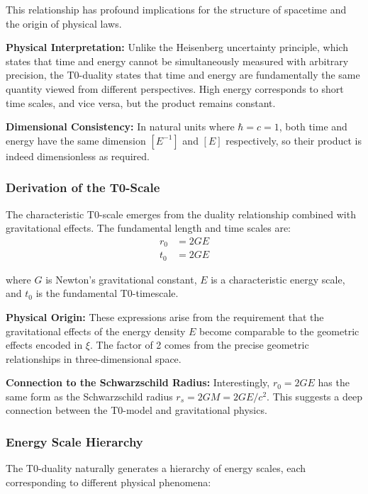 \documentclass[12pt,a4paper]{article}
\newcommand{\Tzero}{t_0}
\newcommand{\xigeom}{\xi}
\begin{document}
	This relationship has profound implications for the structure of spacetime and the origin of physical laws.
	
	\textbf{Physical Interpretation:} Unlike the Heisenberg uncertainty principle, which states that time and energy cannot be simultaneously measured with arbitrary precision, the T0-duality states that time and energy are fundamentally the same quantity viewed from different perspectives. High energy corresponds to short time scales, and vice versa, but the product remains constant.
	
	\textbf{Dimensional Consistency:} In natural units where $\hbar = c = 1$, both time and energy have the same dimension $[E^{-1}]$ and $[E]$ respectively, so their product is indeed dimensionless as required.
	
	\subsubsection{Derivation of the T0-Scale}
	
	The characteristic T0-scale emerges from the duality relationship combined with gravitational effects. The fundamental length and time scales are:
	\begin{align}
		r_0 &= 2GE \\
		\Tzero &= 2GE
	\end{align}
	
	where $G$ is Newton's gravitational constant, $E$ is a characteristic energy scale, and $\Tzero$ is the fundamental T0-timescale.
	
	\textbf{Physical Origin:} These expressions arise from the requirement that the gravitational effects of the energy density $E$ become comparable to the geometric effects encoded in $\xigeom$. The factor of 2 comes from the precise geometric relationships in three-dimensional space.
	
	\textbf{Connection to the Schwarzschild Radius:} Interestingly, $r_0 = 2GE$ has the same form as the Schwarzschild radius $r_s = 2GM = 2GE/c^2$. This suggests a deep connection between the T0-model and gravitational physics.
	
	\subsubsection{Energy Scale Hierarchy}
	
	The T0-duality naturally generates a hierarchy of energy scales, each corresponding to different physical phenomena:
	
\end{document}
